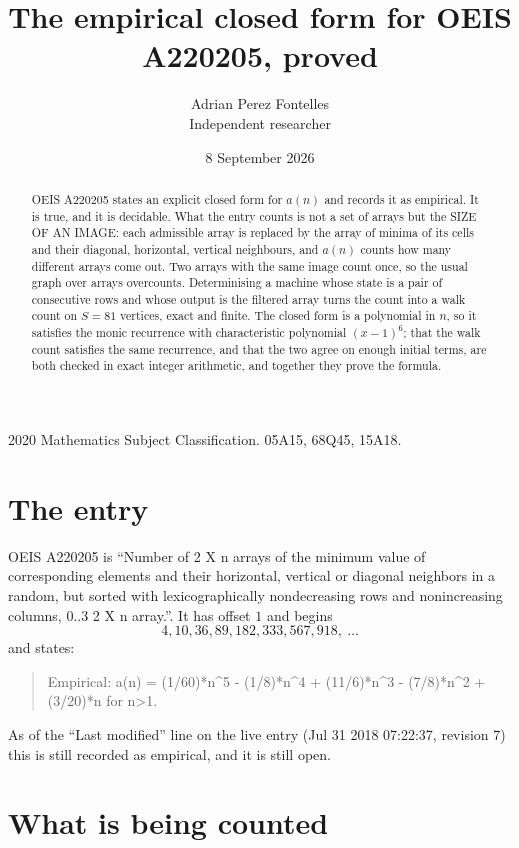 \documentclass[11pt,a4paper]{article}
\title{The empirical closed form for OEIS A220205, proved}
\author{Adrian Perez Fontelles\\ \small Independent researcher}
\date{8 September 2026}
\theoremstyle{plain}
\theoremstyle{definition}
\begin{document}
\maketitle

\begin{abstract}
OEIS A220205 states an explicit closed form for $a(n)$ and records it as empirical. It is true, and
it is decidable. What the entry counts is not a set of arrays but the SIZE OF AN IMAGE: each
admissible array is replaced by the array of minima of its cells and their diagonal, horizontal, vertical neighbours,
and $a(n)$ counts how many different arrays come out. Two arrays with the same image count
once, so the usual graph over arrays overcounts. Determinising a machine whose state is a pair
of consecutive rows and whose output is the filtered array turns the count into a walk count on
$S=81$ vertices, exact and finite. The closed form is a polynomial in $n$, so it satisfies the
monic recurrence with characteristic polynomial $(x-1)^{6}$; that the walk count
satisfies the same recurrence, and that the two agree on enough initial terms, are both checked
in exact integer arithmetic, and together they prove the formula.
\end{abstract}

\noindent\small 2020 Mathematics Subject Classification. 05A15, 68Q45, 15A18.\normalsize

\section{The entry}

OEIS A220205 is ``Number of 2 X n arrays of the minimum value of corresponding elements and their horizontal, vertical or diagonal neighbors in a random, but sorted with lexicographically nondecreasing rows and nonincreasing columns, 0..3 2 X n array.''. It has offset $1$ and begins
\[
4, 10, 36, 89, 182, 333, 567, 918,\ \dots
\]
and states:
\begin{quote}
Empirical: a(n) = (1/60)*n\^{}5 - (1/8)*n\^{}4 + (11/6)*n\^{}3 - (7/8)*n\^{}2 + (3/20)*n for n>1.
\end{quote}
As of the ``Last modified'' line on the live entry (Jul 31 2018 07:22:37, revision 7)
this is still recorded as empirical, and it is still open.

\section{What is being counted}
\end{document}
